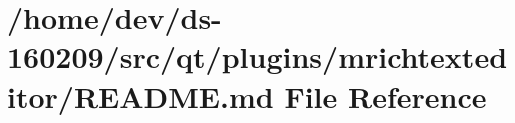 \hypertarget{qt_2plugins_2mrichtexteditor_2_r_e_a_d_m_e_8md}{}\section{/home/dev/ds-\/160209/src/qt/plugins/mrichtexteditor/\+R\+E\+A\+D\+M\+E.md File Reference}
\label{qt_2plugins_2mrichtexteditor_2_r_e_a_d_m_e_8md}
